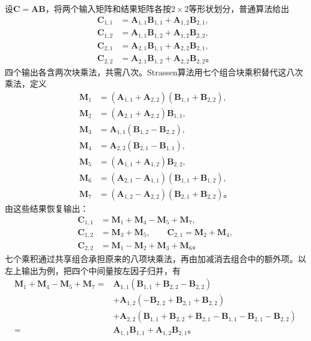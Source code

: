 设$\bm C=\bm A\bm B$，将两个输入矩阵和结果矩阵各按$2\times2$等形状划分，普通算法给出
\begin{equation}
  \begin{aligned}
    \bm C_{1,1}&=\bm A_{1,1}\bm B_{1,1}+\bm A_{1,2}\bm B_{2,1},\\
    \bm C_{1,2}&=\bm A_{1,1}\bm B_{1,2}+\bm A_{1,2}\bm B_{2,2},\\
    \bm C_{2,1}&=\bm A_{2,1}\bm B_{1,1}+\bm A_{2,2}\bm B_{2,1},\\
    \bm C_{2,2}&=\bm A_{2,1}\bm B_{1,2}+\bm A_{2,2}\bm B_{2,2}\text{。}
  \end{aligned}
  \label{eq:cnn-classical-block-product}
\end{equation}
四个输出各含两次块乘法，共需八次。Strassen算法用七个组合块乘积替代这八次乘法，定义
\begin{equation}
  \begin{aligned}
    \bm M_1&=(\bm A_{1,1}+\bm A_{2,2})(\bm B_{1,1}+\bm B_{2,2}),\\
    \bm M_2&=(\bm A_{2,1}+\bm A_{2,2})\bm B_{1,1},\\
    \bm M_3&=\bm A_{1,1}(\bm B_{1,2}-\bm B_{2,2}),\\
    \bm M_4&=\bm A_{2,2}(\bm B_{2,1}-\bm B_{1,1}),\\
    \bm M_5&=(\bm A_{1,1}+\bm A_{1,2})\bm B_{2,2},\\
    \bm M_6&=(\bm A_{2,1}-\bm A_{1,1})(\bm B_{1,1}+\bm B_{1,2}),\\
    \bm M_7&=(\bm A_{1,2}-\bm A_{2,2})(\bm B_{2,1}+\bm B_{2,2})\text{。}
  \end{aligned}
  \label{eq:cnn-strassen-products}
\end{equation}
由这些结果恢复输出：
\begin{equation}
  \begin{aligned}
    \bm C_{1,1}&=\bm M_1+\bm M_4-\bm M_5+\bm M_7,\\
    \bm C_{1,2}&=\bm M_3+\bm M_5,\qquad
    \bm C_{2,1}=\bm M_2+\bm M_4,\\
    \bm C_{2,2}&=\bm M_1-\bm M_2+\bm M_3+\bm M_6\text{。}
  \end{aligned}
  \label{eq:cnn-strassen-recovery}
\end{equation}
七个乘积通过共享组合承担原来的八项块乘法，再由加减消去组合中的额外项。以左上输出为例，把四个中间量按左因子归并，有
\begin{equation}
  \begin{aligned}
    \bm M_1+\bm M_4-\bm M_5+\bm M_7
    ={}&\bm A_{1,1}(\bm B_{1,1}+\bm B_{2,2}-\bm B_{2,2})\\
       &+\bm A_{1,2}(-\bm B_{2,2}+\bm B_{2,1}+\bm B_{2,2})\\
       &+\bm A_{2,2}(\bm B_{1,1}+\bm B_{2,2}
                       +\bm B_{2,1}-\bm B_{1,1}
                       -\bm B_{2,1}-\bm B_{2,2})\\
    ={}&\bm A_{1,1}\bm B_{1,1}+\bm A_{1,2}\bm B_{2,1}\text{。}
  \end{aligned}
  \label{eq:cnn-strassen-cancellation}
\end{equation}
